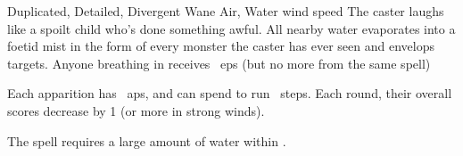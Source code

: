   {Duplicated, Detailed, Divergent}%
  {Wane}%
  {Air, Water}%
  {wind speed}%
  {
    The caster laughs like a spoilt child who's done something awful.
    All nearby water evaporates into a foetid mist in the form of every \gls{monster} the caster has ever seen and envelops  targets.
    Anyone breathing in receives ~\glspl{ep} (but no more from the same \gls{spell})}%
  {Each apparition has ~\glspl{ap}, and can spend  to run ~\glspl{step}.
  Each \gls{round}, their overall scores decrease by 1 (or more in strong winds).

  The spell requires a large amount of water within \spellRange.}
